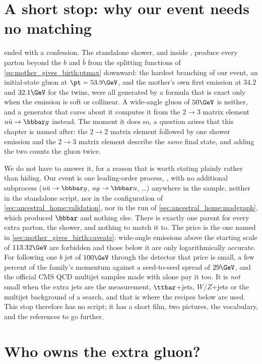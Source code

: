 \section{A short stop: why our event needs no matching}
\label{sec:whose_child:why_short}

 ended with a confession. The standalone shower,
and \PYTHIA inside \CMSSW, produce every parton beyond the $b$ and $\bar b$
from the splitting functions of \cref{eq:mother_gives_birth:ptmax} downward:
the hardest branching of our event, an initial-state gluon at
$\pt=53.9\GeV$, and the mother's own first emission at $34.2$ and $32.1\GeV$
for the twins, were all generated by a formula that is exact only when the
emission is soft or collinear. A wide-angle gluon of $50\GeV$ is neither,
and a generator that cares about it computes it from the $2\to3$ matrix
element $u\bar u\to\bbbar g$ instead. The moment it does so, a question
arises that this chapter is named after: the $2\to2$ matrix element followed
by one shower emission and the $2\to3$ matrix element describe the \emph{same}
final state, and adding the two counts the gluon twice.

We do not have to answer it, for a reason that is worth stating plainly
rather than hiding. Our event is one leading-order process,
, with no additional subprocess
($u\bar u\to\bbbar g$, $ug\to\bbbar u$, \dots) anywhere in the sample, neither
in the standalone script, nor in the \CMSSW configuration of
\cref{sec:ancestral_home:validation}, nor in the \MG run of
\cref{sec:ancestral_home:madgraph}, which produced $\bbbar$ and nothing
else. There is exactly one parent for every extra parton, the shower, and
nothing to match it to. The price is the one named in
\cref{sec:mother_gives_birth:caveats}: wide-angle emissions above the
starting scale of $113.32\GeV$ are forbidden and those below it are only
logarithmically accurate. For following one $b$ jet of $100\GeV$ through
the detector that price is small, a few percent of the family's momentum
against a seed-to-seed spread of $29\GeV$, and the official CMS QCD
multijet samples made with \PYTHIA alone pay it too. It is \emph{not} small
when the extra jets are the measurement, $\ttbar$+jets, $W/Z$+jets or the
multijet background of a search, and that is where the recipes below are
used. This stop therefore has no script; it has a short film, two
pictures, the vocabulary, and the references to go further.

\section{Who owns the extra gluon?}
\label{sec:whose_child:who_owns}

